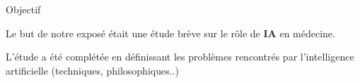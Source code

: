 \begin{frame}{Objectif}
    \begin{enumerate}[<+-|alert@+>]
        \myitem
        Le  but  de notre exposé était une étude brève sur le rôle de \textbf{IA} en
        médecine.

        \myitem
        L'étude a été complétée en définissant les problèmes rencontrés par
        l'intelligence artificielle (techniques, philosophiques..)\mybox

    \end{enumerate}
\end{frame}


